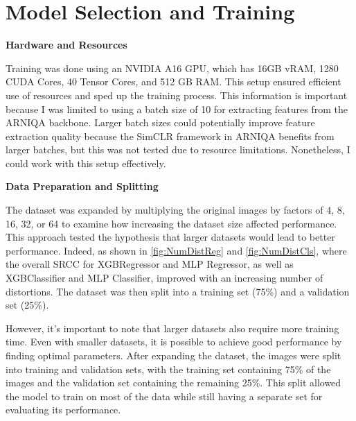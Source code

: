 \section{Model Selection and Training}
\label{sec:ModelTraining}
\textbf{Hardware and Resources} \par
\noindent
Training was done using an NVIDIA A16 GPU, which has 16GB vRAM, 1280 CUDA Cores, 40 Tensor Cores, and 512 GB RAM. This setup ensured efficient use of resources and sped up the training process. This information is important because I was limited to using a batch size of 10 for extracting features from the ARNIQA backbone. Larger batch sizes could potentially improve feature extraction quality because the SimCLR framework in ARNIQA benefits from larger batches, but this was not tested due to resource limitations. Nonetheless, I could work with this setup effectively.  \par
\vspace{\baselineskip}
\noindent
\textbf{Data Preparation and Splitting} \par
\noindent
The dataset was expanded by multiplying the original images by factors of 4, 8, 16, 32, or 64 to examine how increasing the dataset size affected performance. This approach tested the hypothesis that larger datasets would lead to better performance. Indeed, as shown in \autoref{fig:NumDistReg} and \autoref{fig:NumDistCls}, where the overall SRCC for XGBRegressor and MLP Regressor, as well as XGBClassifier and MLP Classifier, improved with an increasing number of distortions. The dataset was then split into a training set (75\%) and a validation set (25\%). \par
\vspace{\baselineskip}
\noindent
However, it's important to note that larger datasets also require more training time. Even with smaller datasets, it is possible to achieve good performance by finding optimal parameters.  After expanding the dataset, the images were split into training and validation sets, with the training set containing 75\% of the images and the validation set containing the remaining 25\%. This split allowed the model to train on most of the data while still having a separate set for evaluating its performance. \par
